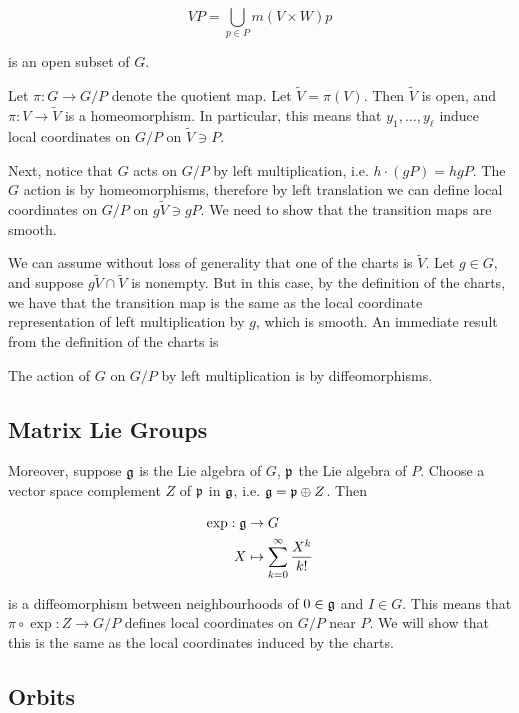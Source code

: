 \documentclass{article}
\renewcommand{\tilde}{\widetilde}
\begin{document}
\[VP = \bigcup_{p \in P}m(V \times W)p\]

is an open subset of \(G\).

Let \(\pi : G \to G/P\) denote the quotient map. Let \(\tilde V = \pi(V)\). Then \(\tilde V\) is open, and \(\pi : V \to \tilde V\) is a homeomorphism. In particular, this means that \(y_1 , \dots, y_\ell\) induce local coordinates on \(G/P\) on \(\tilde V \ni P\).

Next, notice that \(G\) acts on \(G/P\) by left multiplication, i.e. \(h \cdot (gP) = hgP\). The \(G\) action is by homeomorphisms, therefore by left translation we can define local coordinates on \(G/P\) on \(g \tilde V \ni gP\). We need to show that the transition maps are smooth.

We can assume without loss of generality that one of the charts is \(\tilde V\). Let \(g \in G\), and suppose \(g \tilde V \cap \tilde V\) is nonempty. But in this case, by the definition of the charts, we have that the transition map is the same as the local coordinate representation of left multiplication by \(g\), which is smooth. An immediate result from the definition of the charts is

\begin{proposition}
    \label{prop:quot-mfd-left-diffeos} The action of \(G\) on \(G/P\) by left multiplication is by diffeomorphisms.
\end{proposition}

\subsection{Matrix Lie Groups}

\label{sec:matrix-lie-groups}

Moreover, suppose \(\mathfrak{g}\) is the Lie algebra of \(G\), \(\mathfrak{p}\) the Lie algebra of \(P\). Choose a vector space complement \(Z\) of \(\mathfrak{p}\) in \(\mathfrak{g}\), i.e. \(\mathfrak{g} = \mathfrak{p} \oplus Z\). Then

\begin{align*}
    \exp : \mathfrak{g} &\to G \\
    X &\mapsto \sum_{k=0}^\infty \frac{X^k}{k!}
\end{align*}

is a diffeomorphism between neighbourhoods of \(0 \in \mathfrak{g}\) and \(I \in G\). This means that \(\pi \circ \exp : Z \to G/P\) defines local coordinates on \(G/P\) near \(P\). We will show that this is the same as the local coordinates induced by the charts. 

\subsection{Orbits}
\end{document}
